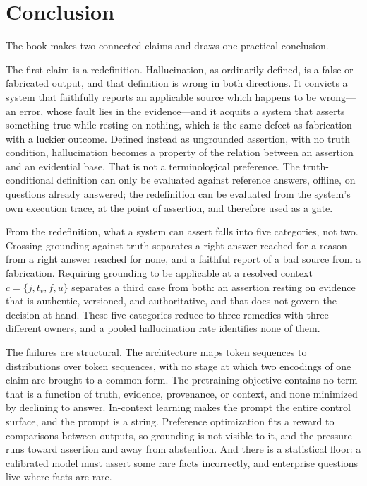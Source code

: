 \chapter{Conclusion}
\label{ch:conclusion}
\label{sec:conclusion}

The book makes two connected claims and draws one practical conclusion.

The first claim is a redefinition. Hallucination, as ordinarily defined, is a false
or fabricated output, and that definition is wrong in both directions. It convicts a
system that faithfully reports an applicable source which happens to be
wrong---an error, whose fault lies in the evidence---and it acquits a system that
asserts something true while resting on nothing, which is the same defect as
fabrication with a luckier outcome. Defined instead as ungrounded assertion, with no
truth condition, hallucination becomes a property of the relation between an
assertion and an evidential base. That is not a terminological preference. The
truth-conditional definition can only be evaluated against reference answers, offline,
on questions already answered; the redefinition can be evaluated from the system's
own execution trace, at the point of assertion, and therefore used as a gate.

From the redefinition, what a system can assert falls into five categories, not two. Crossing
grounding against truth separates a right answer reached for a reason from a right
answer reached for none, and a faithful report of a bad source from a fabrication.
Requiring grounding to be applicable at a resolved context $c = \{j, t_v, f, u\}$
separates a third case from both: an assertion resting on evidence that is
authentic, versioned, and authoritative, and that does not govern the decision at
hand. These five categories reduce to three remedies with three different owners,
and a pooled hallucination rate identifies none of them.

The failures are structural. The architecture maps token sequences to
distributions over token sequences, with no stage at which two encodings of one
claim are brought to a common form. The pretraining objective contains no term that
is a function of truth, evidence, provenance, or context, and none minimized by
declining to answer. In-context learning makes the prompt the entire control
surface, and the prompt is a string. Preference optimization fits a reward to
comparisons between outputs, so grounding is not visible to it, and the pressure
runs toward assertion and away from abstention. And there is a statistical floor: a
calibrated model must assert some rare facts incorrectly, and enterprise questions
live where facts are rare.

